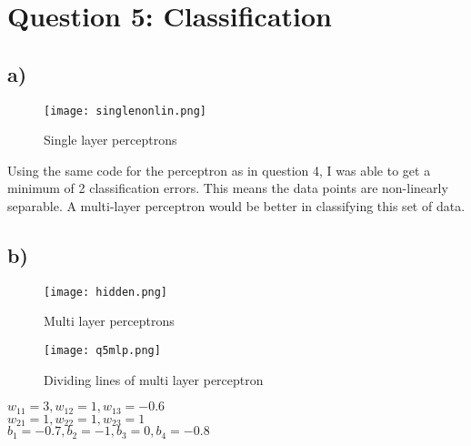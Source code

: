 \section*{Question 5: Classification}

\subsection*{a)}
\begin{figure}[H]
\caption{Single layer perceptrons}
\texttt{[image: singlenonlin.png]}
\centering
\end{figure}

Using the same code for the perceptron as in question 4, I was able to get a minimum of 2 classification errors. This means the data points are non-linearly separable. A multi-layer perceptron would be better in classifying this set of data.



\subsection*{b)}

\begin{figure}[H]
\caption{Multi layer perceptrons}
\texttt{[image: hidden.png]}
\centering
\end{figure}

\begin{figure}[H]
\caption{Dividing lines of multi layer perceptron}
\texttt{[image: q5mlp.png]}
\centering
\end{figure}

$w_{11} = 3, w_{12} = 1, w_{13} = -0.6$\\
$w_{21} = 1, w_{22} = 1, w_{23} = 1$\\
$b_1 = -0.7, b_2 = -1, b_3 = 0, b_4 = -0.8$\\